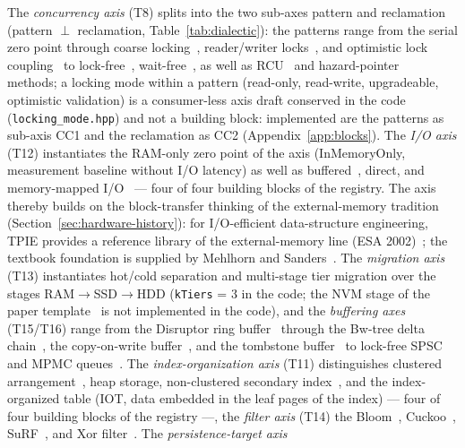 \begin{nurlang}
The \emph{concurrency axis} (T8) splits into the two sub-axes pattern and reclamation
(pattern $\perp$ reclamation, Table~\ref{tab:dialectic}): the patterns range from the serial zero point
through coarse locking~\cite{dijkstra1965concurrent}, reader/writer locks~\cite{courtois1971readers}, and
optimistic lock coupling~\cite{leis2016olc} to lock-free~\cite{michael1996queue},
wait-free~\cite{herlihy1991waitfree}, as well as RCU~\cite{mckenney2001rcu} and
hazard-pointer~\cite{michael2004hazard} methods; a locking mode within a pattern (read-only,
read-write, upgradeable, optimistic validation) is a consumer-less axis draft conserved in the code
(\texttt{locking\_\allowbreak{}mode.hpp}) and not a building block: implemented are the patterns as
sub-axis CC1 and the reclamation as CC2 (Appendix~\ref{app:blocks}). The \emph{I/O axis} (T12) instantiates
the RAM-only zero point of the axis (InMemoryOnly, measurement baseline without I/O latency) as well as
buffered~\cite{stonebraker1981os}, direct, and memory-mapped I/O~\cite{crotty2022mmap} --- four
of four building blocks of the registry. The axis
thereby builds on the block-transfer thinking of the external-memory tradition
(Section~\ref{sec:hardware-history}): for I/O-efficient data-structure engineering, TPIE provides a
reference library of the external-memory line (ESA 2002)~\cite{arge2002tpie}; the textbook foundation is supplied by
Mehlhorn and Sanders~\cite{mehlhorn2008toolbox}. The \emph{migration axis} (T13) instantiates
hot/cold separation and multi-stage tier migration over the stages RAM$\to$SSD$\to$HDD (\texttt{kTiers} = 3 in the
code; the NVM stage of the paper template~\cite{vanrenen2018nvm} is not implemented in the code), and the
\emph{buffering axes} (T15/T16) range from the Disruptor ring buffer~\cite{thompson2011disruptor} through
the Bw-tree delta chain~\cite{levandoski2013bwtree}, the copy-on-write buffer~\cite{driscoll1989persistent}, and
the tombstone buffer~\cite{oneil1996lsm} to lock-free SPSC~\cite{lamport_spsc, lamport1983specifying} and
MPMC queues~\cite{michael1996queue}. The \emph{index-organization axis} (T11) distinguishes clustered
arrangement~\cite{bayer1972btree}, heap storage, non-clustered secondary index~\cite{comer1979btree}, and the
index-organized table (IOT, data embedded in the leaf pages of the index) --- four of four
building blocks of the registry ---,
the \emph{filter axis} (T14) the Bloom~\cite{bloom1970}, Cuckoo~\cite{fan2014cuckoo},
SuRF~\cite{zhang2018surf}, and Xor filter~\cite{graf2020xor}. The \emph{persistence-target axis}

\end{nurlang}
